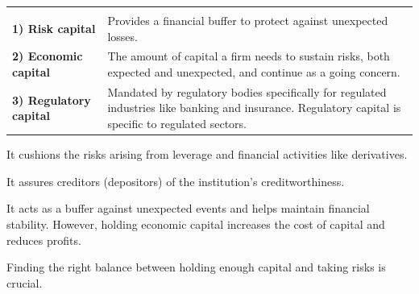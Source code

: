


\noindent\begin{minipage}{\textwidth}
\renewcommand{\arraystretch}{1.35}
\begin{tabularx}{\textwidth}{@{}L{0.24\textwidth}Y@{}}
  & \\
{\tabfont \textbf{1) Risk capital}} &
{\tabfont Provides a financial buffer to protect against unexpected losses.}\\
{\tabfont \textbf{2) Economic capital}} &
{\tabfont The amount of capital a firm needs to sustain risks, both expected and
unexpected, and continue as a going concern.}\\
{\tabfont \textbf{3) Regulatory capital}} &
{\tabfont Mandated by regulatory bodies specifically for regulated industries like
banking and insurance. Regulatory capital is specific to regulated sectors.}\\
\end{tabularx}
\end{minipage}


\begin{lettered}
\item It cushions the risks arising from leverage and financial activities like
derivatives.
\item It assures creditors (depositors) of the institution's creditworthiness.
\item It acts as a buffer against unexpected events and helps maintain financial
stability. However, holding economic capital increases the cost of capital and
reduces profits.
\item Finding the right balance between holding enough capital and taking risks is
crucial.
\end{lettered}


